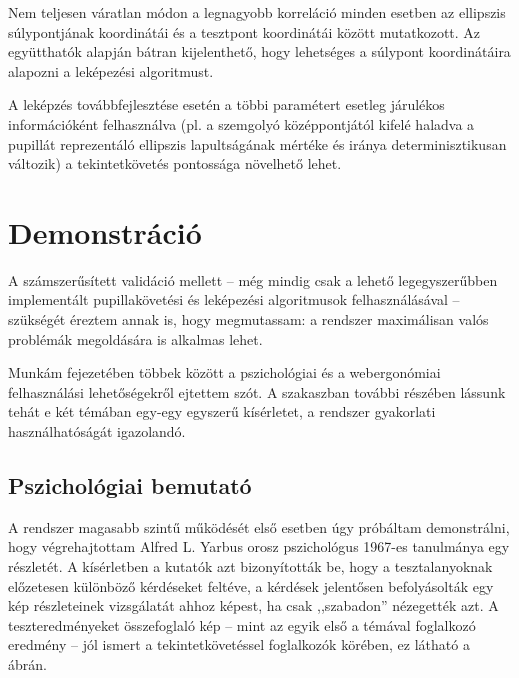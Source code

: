 Nem teljesen váratlan módon a legnagyobb korreláció minden esetben az ellipszis súlypontjának koordinátái és a tesztpont koordinátái között mutatkozott. Az együtthatók alapján bátran kijelenthető, hogy lehetséges a súlypont koordinátáira alapozni a leképezési algoritmust.

A leképzés továbbfejlesztése esetén a többi paramétert esetleg járulékos információként felhasználva (pl. a szemgolyó középpontjától kifelé haladva a pupillát reprezentáló ellipszis lapultságának mértéke és iránya determinisztikusan változik) a tekintetkövetés pontossága növelhető lehet.

\section{Demonstráció}\label{sect:demonstracio}

A számszerűsített validáció mellett -- még mindig csak a lehető legegyszerűbben implementált pupillakövetési és leképezési algoritmusok felhasználásával -- szükségét éreztem annak is, hogy megmutassam: a rendszer maximálisan valós problémák megoldására is alkalmas lehet.

Munkám  fejezetében többek között a pszichológiai és a webergonómiai felhasználási lehetőségekről ejtettem szót. A szakaszban további részében lássunk tehát e két témában egy-egy egyszerű kísérletet, a rendszer gyakorlati használhatóságát igazolandó. 

\subsection{Pszichológiai bemutató}\label{sect:pszicho}

A rendszer magasabb szintű működését első esetben úgy próbáltam demonstrálni, hogy végrehajtottam Alfred L. Yarbus orosz pszichológus 1967-es tanulmánya egy részletét. A kísérletben a kutatók azt bizonyították be, hogy a tesztalanyoknak előzetesen különböző kérdéseket feltéve, a kérdések jelentősen befolyásolták egy kép részleteinek vizsgálatát ahhoz képest, ha csak ,,szabadon'' nézegették azt. A teszteredményeket összefoglaló kép -- mint az egyik első a témával foglalkozó eredmény -- jól ismert a tekintetkövetéssel foglalkozók körében, ez látható a  ábrán.

